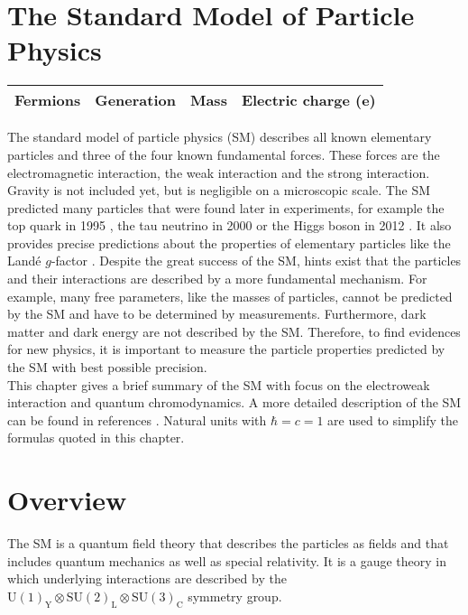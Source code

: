 \section{The Standard Model of Particle Physics}
\begin{tabular}{cccccc}
\hline
\multirow{2}{*}{Fermions} & \multicolumn{3}{*}{Generation} & Mass & Electric charge (e) & Weak isospin \\
\hline
\end{tabular}

The standard model of particle physics (SM) describes all known elementary particles and three of the four known fundamental forces. These forces are the electromagnetic interaction, the weak interaction and the strong interaction. Gravity is not included yet, but is negligible on a microscopic scale. The SM predicted many particles that were found later in experiments, for example the top quark in 1995 \cite{tdiscovery}, the tau neutrino in 2000 \cite{tau2000} or the Higgs boson in 2012 \cite{ATLAS_higgs_1207, CMS_higgs_1207}. It also provides precise predictions about the properties of elementary particles like the Landé $g$-factor \cite{Lande}. Despite the great success of the SM, hints exist that the particles and their interactions are described by a more fundamental mechanism. For example, many free parameters, like the masses of particles, cannot be predicted by the SM and have to be determined by measurements. Furthermore, dark matter and dark energy are not described by the SM. Therefore, to find evidences for new physics, it is important to measure the particle properties predicted by the SM with best possible precision. \\

This chapter gives a brief summary of the SM with focus on the electroweak interaction and quantum chromodynamics. A more detailed description of the SM can be found in references \cite{QuarksAndLeptons, Gordon, PhysicsFromSymmetry, Peskin}. Natural units with $\hbar = c = 1$ are used to simplify the formulas quoted in this chapter. 


\section{Overview}

The SM is a quantum field theory that describes the particles as fields and that includes quantum mechanics as well as special relativity. It is a gauge theory in which underlying interactions are described by the $\textrm{U}(1)_\textrm{Y}\otimes \textrm{SU}(2)_\textrm{L}\otimes \textrm{SU}(3)_\textrm{C}$ symmetry group. \\

